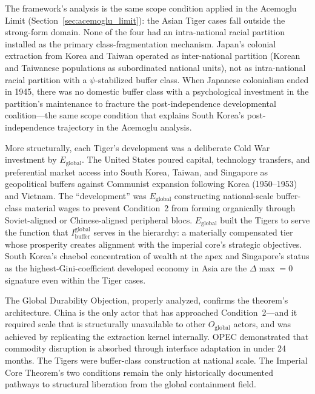 The framework's analysis is the same scope condition applied in the Acemoglu Limit (Section~\ref{sec:acemoglu_limit}): the Asian Tiger cases fall outside the strong-form domain. None of the four had an intra-national racial partition installed as the primary class-fragmentation mechanism. Japan's colonial extraction from Korea and Taiwan operated as inter-national partition (Korean and Taiwanese populations as subordinated national units), not as intra-national racial partition with a $\psi$-stabilized buffer class. When Japanese colonialism ended in 1945, there was no domestic buffer class with a psychological investment in the partition's maintenance to fracture the post-independence developmental coalition---the same scope condition that explains South Korea's post-independence trajectory in the Acemoglu analysis.

More structurally, each Tiger's development was a deliberate Cold War investment by $E_{\text{global}}$. The United States poured capital, technology transfers, and preferential market access into South Korea, Taiwan, and Singapore as geopolitical buffers against Communist expansion following Korea (1950--1953) and Vietnam. The ``development'' was $E_{\text{global}}$ constructing national-scale buffer-class material wages to prevent Condition~2 from forming organically through Soviet-aligned or Chinese-aligned peripheral blocs. $E_{\text{global}}$ built the Tigers to serve the function that $I_{\text{buffer}}^{\text{global}}$ serves in the hierarchy: a materially compensated tier whose prosperity creates alignment with the imperial core's strategic objectives. South Korea's chaebol concentration of wealth at the apex and Singapore's status as the highest-Gini-coefficient developed economy in Asia are the $\Delta\max = 0$ signature even within the Tiger cases.

The Global Durability Objection, properly analyzed, confirms the theorem's architecture. China is the only actor that has approached Condition~2---and it required scale that is structurally unavailable to other $O_{\text{global}}$ actors, and was achieved by replicating the extraction kernel internally. OPEC demonstrated that commodity disruption is absorbed through interface adaptation in under 24 months. The Tigers were buffer-class construction at national scale. The Imperial Core Theorem's two conditions remain the only historically documented pathways to structural liberation from the global containment field.


